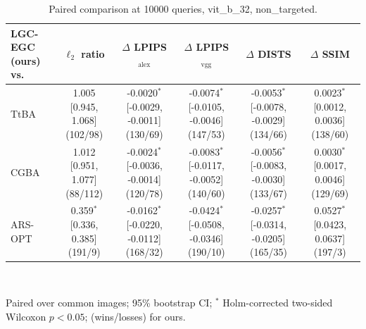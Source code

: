 \begin{table}[t]
\centering\footnotesize
\caption{Paired comparison at 10000 queries, vit\_b\_32, non\_targeted.}
\begin{tabular}{lccccc}
\toprule
LGC-EGC (ours) vs. & $\ell_2$ ratio & $\Delta$ LPIPS$_{\mathrm{alex}}$ & $\Delta$ LPIPS$_{\mathrm{vgg}}$ & $\Delta$ DISTS & $\Delta$ SSIM \\
\midrule
TtBA & 1.005 [0.945, 1.068] (102/98) & -0.0020$^{*}$ [-0.0029, -0.0011] (130/69) & -0.0074$^{*}$ [-0.0105, -0.0046] (147/53) & -0.0053$^{*}$ [-0.0078, -0.0029] (134/66) & 0.0023$^{*}$ [0.0012, 0.0036] (138/60) \\
CGBA & 1.012 [0.951, 1.077] (88/112) & -0.0024$^{*}$ [-0.0036, -0.0014] (120/78) & -0.0083$^{*}$ [-0.0117, -0.0052] (140/60) & -0.0056$^{*}$ [-0.0083, -0.0030] (133/67) & 0.0030$^{*}$ [0.0017, 0.0046] (129/69) \\
ARS-OPT & 0.359$^{*}$ [0.336, 0.385] (191/9) & -0.0162$^{*}$ [-0.0220, -0.0112] (168/32) & -0.0424$^{*}$ [-0.0508, -0.0346] (190/10) & -0.0257$^{*}$ [-0.0314, -0.0205] (165/35) & 0.0527$^{*}$ [0.0423, 0.0637] (197/3) \\
\bottomrule
\end{tabular}
\\[2pt]\parbox{\linewidth}{\scriptsize Paired over common images; 95\% bootstrap CI; $^{*}$ Holm-corrected two-sided Wilcoxon $p<0.05$; (wins/losses) for ours.}
\end{table}
